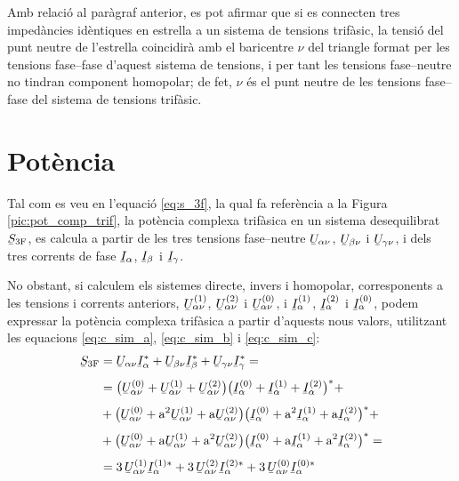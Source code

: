 Amb relaci\'{o} al par\`{a}graf anterior, es pot afirmar que si es
connecten tres imped\`{a}ncies id\`{e}ntiques en estrella a un sistema
de tensions trif\`{a}sic, la tensi\'{o} del punt neutre de l'estrella 
coincidir\`{a} amb el baricentre $\nu$ del triangle format per les tensions
fase--fase d'aquest sistema de tensions, i per tant les tensions fase--neutre no tindran
component homopolar; de fet, $\nu$ \'{e}s el punt neutre de les tensions
fase--fase del sistema de tensions trif\`{a}sic.

\section{Pot\`{e}ncia} 

Tal com es veu en l'equaci\'{o} \eqref{eq:s_3f}, la qual fa refer\`{e}ncia a
la Figura \vref{pic:pot_comp_trif}, la pot\`{e}ncia complexa trif\`{a}sica
en un sistema desequilibrat $\cmplx{S}\ped{3F}$, es calcula a partir
de les tres tensions fase--neutre $\cmplx{U}_{\alpha\nu}$,
$\cmplx{U}_{\beta\nu}$ i $\cmplx{U}_{\gamma\nu}$, i dels tres
corrents de fase $\cmplx{I}_\alpha$, $\cmplx{I}_\beta$ i
$\cmplx{I}_\gamma$.


No obstant, si calculem els sistemes directe, invers i homopolar,
corresponents a les tensions i corrents anteriors,
$\cmplx{U}_{\alpha\nu}\ap{(1)}$, $\cmplx{U}_{\alpha\nu}\ap{(2)}$ i
$\cmplx{U}_{\alpha\nu}\ap{(0)}$, i $\cmplx{I}_\alpha\ap{(1)}$,
$\cmplx{I}_\alpha\ap{(2)}$ i $\cmplx{I}_\alpha\ap{(0)}$, podem
expressar la pot\`{e}ncia complexa trif\`{a}sica a partir d'aquests nous
valors, utilitzant les equacions \eqref{eq:c_sim_a},
\eqref{eq:c_sim_b} i \eqref{eq:c_sim_c}:
\begin{equation}
\begin{split}
   \cmplx{S}\ped{3F} &= \cmplx{U}_{\alpha\nu} \cmplx{I}_\alpha^* +
   \cmplx{U}_{\beta\nu} \cmplx{I}_\beta^* +  \cmplx{U}_{\gamma\nu} \cmplx{I}_\gamma^* = \\[1ex]
   &= \big(\cmplx{U}_{\alpha\nu}^{(0)} + \cmplx{U}_{\alpha\nu}^{(1)} +
   \cmplx{U}_{\alpha\nu}^{(2)}\big) \big(\cmplx{I}_\alpha^{(0)} + \cmplx{I}_\alpha^{(1)} +
   \cmplx{I}_\alpha^{(2)}\big)^* +  \\[1ex]
   &+ \big(\cmplx{U}_{\alpha\nu}^{(0)} + \au^2 \cmplx{U}_{\alpha\nu}^{(1)} +
   \au \cmplx{U}_{\alpha\nu}^{(2)} \big) \big(\cmplx{I}_\alpha^{(0)} + \au^2 \cmplx{I}_\alpha^{(1)}
    + \au \cmplx{I}_\alpha^{(2)} \big)^* + \\[1ex]
   &+ \big(\cmplx{U}_{\alpha\nu}^{(0)} + \au \cmplx{U}_{\alpha\nu}^{(1)} + \au^2
   \cmplx{U}_{\alpha\nu}^{(2)} \big) \big(\cmplx{I}_\alpha^{(0)} + \au
   \cmplx{I}_\alpha^{(1)} + \au^2 \cmplx{I}_\alpha^{(2)} \big)^* =  \\[1ex]
   &= 3\, \cmplx{U}_{\alpha\nu}^{(1)}  \cmplx{I}_\alpha^{(1)*} +
   3\, \cmplx{U}_{\alpha\nu}^{(2)}  \cmplx{I}_\alpha^{(2)*} +
   3\, \cmplx{U}_{\alpha\nu}^{(0)}  \cmplx{I}_\alpha^{(0)*} \label{eq:c_sim_s}
\end{split}
\end{equation}

